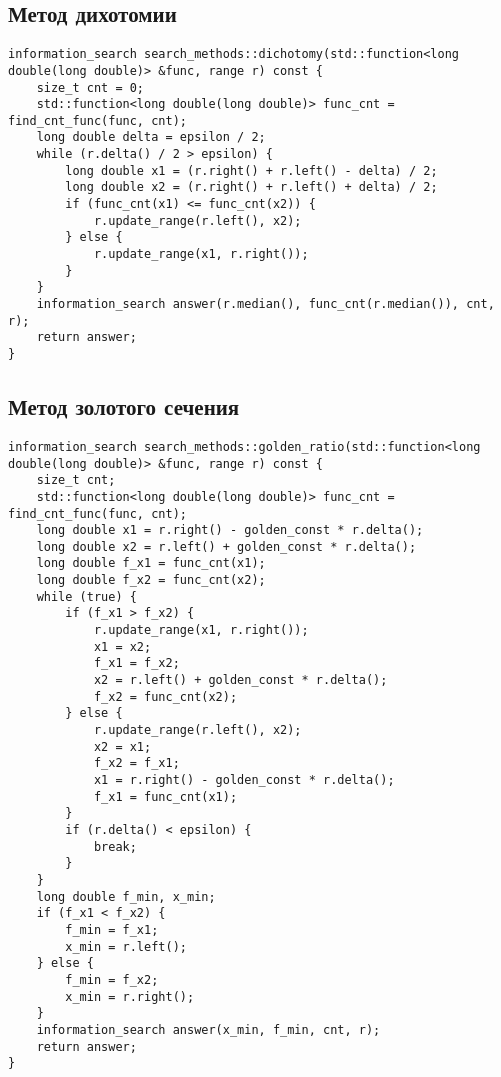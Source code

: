 \subsection {Метод дихотомии}

\begin{lstlisting}
information_search search_methods::dichotomy(std::function<long double(long double)> &func, range r) const {
	size_t cnt = 0;
	std::function<long double(long double)> func_cnt = find_cnt_func(func, cnt);
	long double delta = epsilon / 2;
	while (r.delta() / 2 > epsilon) {
		long double x1 = (r.right() + r.left() - delta) / 2;
		long double x2 = (r.right() + r.left() + delta) / 2;
		if (func_cnt(x1) <= func_cnt(x2)) {
			r.update_range(r.left(), x2);
		} else {
			r.update_range(x1, r.right());
		}
	}
	information_search answer(r.median(), func_cnt(r.median()), cnt, r);
	return answer;
}
\end{lstlisting}

\newpage
\subsection {Метод золотого сечения}

\begin{lstlisting}
information_search search_methods::golden_ratio(std::function<long double(long double)> &func, range r) const {
    size_t cnt;
    std::function<long double(long double)> func_cnt = find_cnt_func(func, cnt);
    long double x1 = r.right() - golden_const * r.delta();
    long double x2 = r.left() + golden_const * r.delta();
    long double f_x1 = func_cnt(x1);
    long double f_x2 = func_cnt(x2);
    while (true) {
        if (f_x1 > f_x2) {
            r.update_range(x1, r.right());
            x1 = x2;
            f_x1 = f_x2;
            x2 = r.left() + golden_const * r.delta();
            f_x2 = func_cnt(x2);
        } else {
            r.update_range(r.left(), x2);
            x2 = x1;
            f_x2 = f_x1;
            x1 = r.right() - golden_const * r.delta();
            f_x1 = func_cnt(x1);
        }
        if (r.delta() < epsilon) {
            break;
        }
    }
    long double f_min, x_min;
    if (f_x1 < f_x2) {
        f_min = f_x1;
        x_min = r.left();
    } else {
        f_min = f_x2;
        x_min = r.right();
    }
    information_search answer(x_min, f_min, cnt, r);
    return answer;
}
\end{lstlisting}


\newpage
